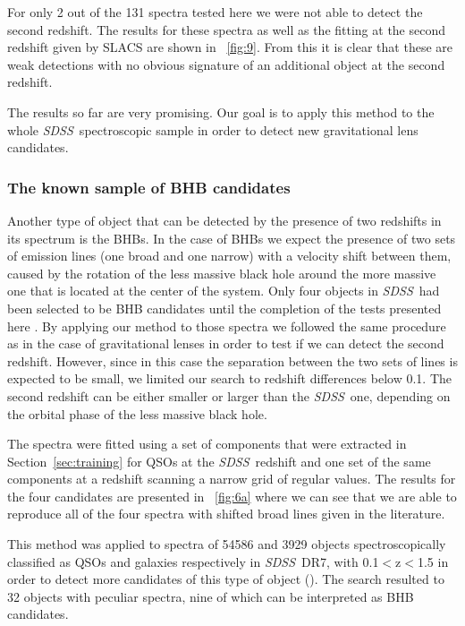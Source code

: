 \documentclass[12pt,preprint]{aastex}
\newcommand{\project}[1]{\textsl{#1}}
\newcommand{\sdss}{\project{SDSS}}
\newcommand{\SDSS}{\sdss}
\newcommand{\sectionname}{Section}
\begin{document}
For only 2 out of the 131 spectra tested here we were not able to
detect the second redshift. The results for these spectra as well as
the fitting at the second redshift given by SLACS are shown in
\figurename~\ref{fig:9}. From this \figurename  it is clear that these are
weak detections with no obvious signature of an additional object at
the second redshift.

The results so far are very promising. Our goal is to apply this method to the
whole \SDSS\ spectroscopic sample in order to detect new gravitational
lens candidates.

\subsubsection{The known sample of BHB candidates}
Another type of object that can be detected by the presence of two
redshifts in its spectrum is the BHBs. In the case of BHBs we
expect the presence of two sets of emission lines (one broad and one
narrow) with a velocity shift between them, caused by the rotation
of the less massive black hole around the more massive one that is
located at the center of the system. Only four objects in \SDSS\ had
been selected to be BHB candidates until the completion of the 
tests presented here
\citep{komossa,bogdanovic09,dotti09,boroson,shields,decarli}. By applying our
method to those spectra we followed the same procedure as in the case
of gravitational lenses in order to test if we can detect the second
redshift. However, since in this case the separation between the two
sets of lines is expected to be small, we limited our search to
redshift differences below 0.1. The second redshift can be either 
smaller or larger than the \SDSS\ one, depending on the orbital phase 
of the less massive black hole.

The spectra were fitted using a set of components that were
extracted in \sectionname~\ref{sec:training} for QSOs at the \SDSS\ 
redshift and one set of the same components at a redshift scanning a
narrow grid of regular values. The results for the four candidates are
presented in \figurename~\ref{fig:6a} where we can see that we are
able to reproduce all of the four spectra with shifted broad lines given 
in the literature.

This method was applied to spectra of 54586 and 3929 objects
spectroscopically classified as QSOs and galaxies respectively in \SDSS\ 
DR7, with 0.1$<$z$<$1.5 in order to detect more candidates of this
type of object (\citealt{tsalmantza}). The search resulted to 32
objects with peculiar spectra, nine of which can be interpreted as BHB
candidates.
\end{document}
